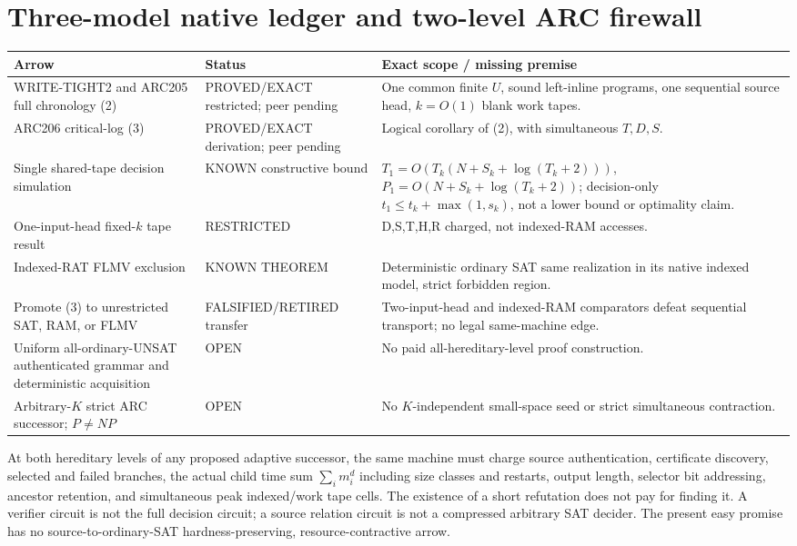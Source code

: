 \documentclass[11pt]{article}
\begin{document}
\section{Three-model native ledger and two-level ARC firewall}
\begin{center}\small
\begin{tabularx}{\linewidth}{p{.28\linewidth}p{.23\linewidth}X}
\toprule
Arrow & Status & Exact scope / missing premise\\ \midrule
WRITE-TIGHT2 and ARC205 full chronology (2) &
PROVED/EXACT restricted; peer pending &
One common finite $U$, sound left-inline programs, one
sequential source head, $k=O(1)$ blank work tapes.\\
ARC206 critical-log (3) & PROVED/EXACT derivation; peer pending &
Logical corollary of (2), with simultaneous $T,D,S$.\\
Single shared-tape decision simulation &
KNOWN constructive bound &
$T_1=O(T_k(N+S_k+\log(T_k+2)))$,
$P_1=O(N+S_k+\log(T_k+2))$;
decision-only $t_1\le t_k+\max(1,s_k)$,
not a lower bound or optimality claim.\\
One-input-head fixed-$k$ tape result &
RESTRICTED & D,S,T,H,R charged,
not indexed-RAM accesses.\\
Indexed-RAT FLMV exclusion & KNOWN THEOREM &
Deterministic ordinary SAT same realization in its
native indexed model, strict forbidden region.\\
Promote (3) to unrestricted SAT, RAM, or FLMV &
FALSIFIED/RETIRED transfer &
Two-input-head and indexed-RAM comparators
defeat sequential transport; no legal same-machine edge.\\
Uniform all-ordinary-UNSAT authenticated grammar and
deterministic acquisition & OPEN &
No paid all-hereditary-level proof construction.\\
Arbitrary-$K$ strict ARC successor; $P\ne NP$ & OPEN &
No $K$-independent small-space seed or
strict simultaneous contraction.\\ \bottomrule
\end{tabularx}
\end{center}
At both hereditary levels of any proposed adaptive successor,
the same machine must charge source authentication,
certificate discovery, selected and failed branches,
the actual child time sum $\sum_i m_i^d$ including size
classes and restarts, output length, selector bit
addressing, ancestor retention, and simultaneous peak
indexed/work tape cells.
The existence of a short refutation does not pay for finding it.
A verifier circuit is not the full decision circuit; a source
relation circuit is not a compressed arbitrary SAT decider.
The present easy promise has no source-to-ordinary-SAT
hardness-preserving, resource-contractive arrow.
\end{document}
